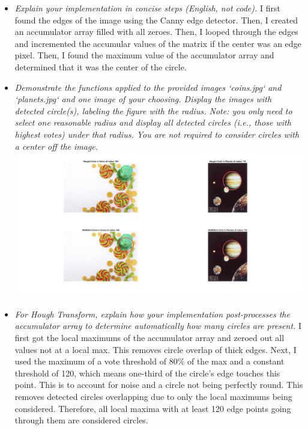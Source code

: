 \documentclass[11pt]{article}
\begin{document}
    \begin{itemize}
        \item \textit{Explain your implementation in concise steps (English, not code).}\newline
        I first found the edges of the image using the Canny edge detector. Then, I created an accumulator
        array filled with all zeroes. Then, I looped through the edges and incremented the accumular values of the
        matrix if the center was an edge pixel. Then, I found the maximum value of the accumulator array and
        determined that it was the center of the circle.\newline

        \item \textit{Demonstrate the functions applied to the provided images ‘coins.jpg‘ and ‘planets.jpg‘ and one
        image of your choosing. Display the images with detected circle(s), labeling the figure with the radius.
        Note: you only need to select one reasonable radius and display all detected circles
            (i.e., those with highest votes) under that radius.
            You are not required to consider circles with a center off the image.}\newline
        \includegraphics[width=\textwidth]{Output Pictures/detection_output}\newline

        \item \textit{For Hough Transform, explain how your implementation post-processes the
        accumulator array to determine automatically how many circles are present.}\newline
        I first got the local maximums of the accumulator array and zeroed out all values not at a local max. This
        removes circle overlap of thick edges. Next, I used the maximum of a vote threshold of 80\% of the max
        and a constant threshold of 120, which means one-third of the
        circle's edge touches this point. This is to account for noise and a circle not being perfectly round. This
        removes detected circles overlapping due to only the local maximums being considered. Therefore, all local
        maxima with at least 120 edge points going through them are considered circles.\newline


\end{itemize}
\end{document}
